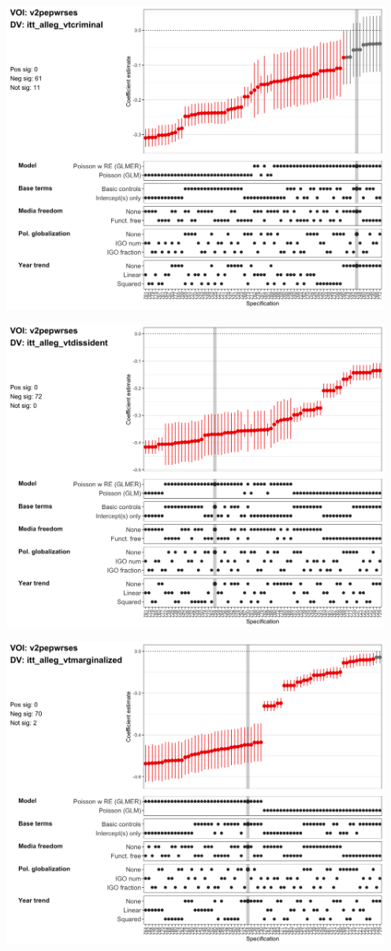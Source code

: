 \documentclass[]{article}
\begin{document}
\includegraphics[height=4in]{../output/figures-robustness/specplot-v2pepwrses-itt_alleg_vtcriminal.png}

\includegraphics[height=4in]{../output/figures-robustness/specplot-v2pepwrses-itt_alleg_vtdissident.png}

\includegraphics[height=4in]{../output/figures-robustness/specplot-v2pepwrses-itt_alleg_vtmarginalized.png}
\end{document}

